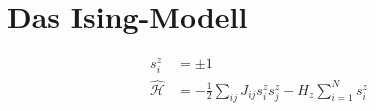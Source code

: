 \section{Das Ising-Modell}
\begin{align*}
  s_i^z &= \pm 1\\
  \hat{\mathcal H} &= -\frac 12\sum _{ij} J_{ij} s_i^z s_j^z - H_z \sum_{i=1}^N s_i^z
\end{align*}
